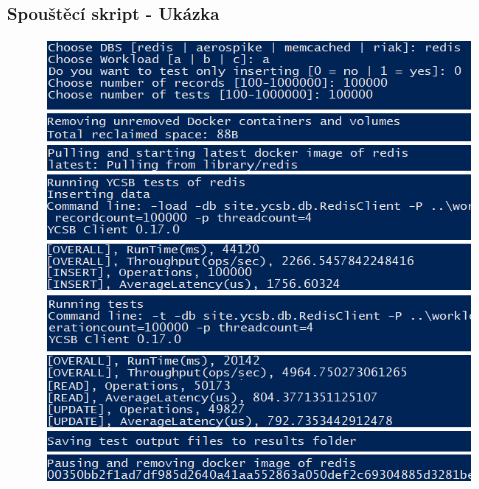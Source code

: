 \documentclass{beamer}
\begin{document}
	\begin{frame}
		\frametitle{Spouštěcí skript - Ukázka}
		\begin{figure}
			\centering
			\includegraphics[scale=0.5]{Figures/tp_init.PNG}
		\end{figure}
	\end{frame}
	
\end{document}
